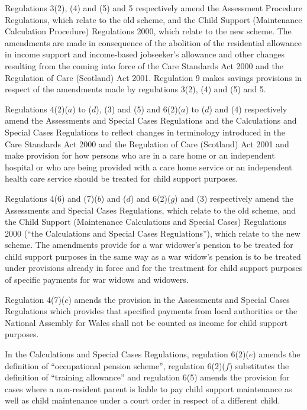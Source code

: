 \documentclass[12pt,a4paper]{article}
\begin{document}
Regulations 3(2), (4) and (5) and 5 respectively amend the Assessment Procedure Regulations, which relate to the old scheme, and the Child Support (Maintenance Calculation Procedure) Regulations 2000, which relate to the new scheme. The amendments are made in consequence of the abolition of the residential allowance in income support and income-based jobseeker’s allowance and other changes resulting from the coming into force of the Care Standards Act 2000 and the Regulation of Care (Scotland) Act 2001. Regulation 9 makes savings provisions in respect of the amendments made by regulations 3(2), (4) and (5) and 5.

Regulations 4(2)($a$)  to ($d$), (3) and (5) and 6(2)($a$)  to ($d$)  and (4) respectively amend the Assessments and Special Cases Regulations and the Calculations and Special Cases Regulations to reflect changes in terminology introduced in the Care Standards Act 2000 and the Regulation of Care (Scotland) Act 2001 and make provision for how persons who are in a care home or an independent hospital or who are being provided with a care home service or an independent health care service should be treated for child support purposes.

Regulations 4(6) and (7)($b$)  and ($d$)  and 6(2)($g$)  and (3) respectively amend the Assessments and Special Cases Regulations, which relate to the old scheme, and the Child Support (Maintenance Calculations and Special Cases) Regulations 2000 (“the Calculations and Special Cases Regulations”), which relate to the new scheme. The amendments provide for a war widower’s pension to be treated for child support purposes in the same way as a war widow’s pension is to be treated under provisions already in force and for the treatment for child support purposes of specific payments for war widows and widowers.

Regulation 4(7)($c$)  amends the provision in the Assessments and Special Cases Regulations which provides that specified payments from local authorities or the National Assembly for Wales shall not be counted as income for child support purposes.

In the Calculations and Special Cases Regulations, regulation 6(2)($e$)  amends the definition of “occupational pension scheme”, regulation 6(2)($f$)  substitutes the definition of “training allowance” and regulation 6(5) amends the provision for cases where a non-resident parent is liable to pay child support maintenance as well as child maintenance under a court order in respect of a different child.
\end{document}
